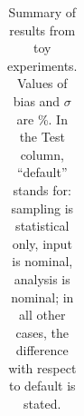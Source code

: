 \begin{table}
\begin{center}
\begin{tabular}{c | c  | c c | c c | c c | c c | c c }
\hline
\hline
\end{tabular}
\caption{Summary of results from toy experiments. Values of bias and $\sigma$ are \%.
In the Test column, ``default'' stands for: sampling is statistical only, input is nominal, analysis is nominal; 
in all other cases, the difference with respect to default is stated.}
\label{tab:toy_summary}
\end{center}
\end{table}



